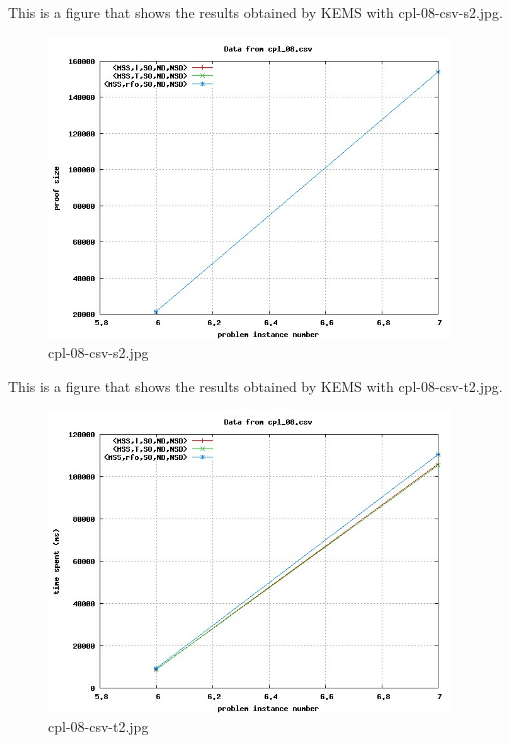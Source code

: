 This is a figure that shows the results obtained by KEMS with cpl-08-csv-s2.jpg.
\begin{figure}[htbp]
\begin{center}
\includegraphics[width=0.95\textwidth]{figuras/cpl-08-csv-s2.jpg}
\end{center}
\caption{cpl-08-csv-s2.jpg}
\end{figure}

This is a figure that shows the results obtained by KEMS with cpl-08-csv-t2.jpg.
\begin{figure}[htbp]
\begin{center}
\includegraphics[width=0.95\textwidth]{figuras/cpl-08-csv-t2.jpg}
\end{center}
\caption{cpl-08-csv-t2.jpg}
\end{figure}

